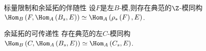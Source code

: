 \begin{proposition}{标量限制和余延拓的伴随性}{}
	设$F$是左$B$-模,则存在典范的$\Z$-模同构$\Hom_{B}\left(F,\Hom_{A}\left(B_{s},E\right)\right)\simeq\Hom_{A}\left(\rho_{\ast}\left(F\right),E\right)$.
\end{proposition}

\begin{proposition}{余延拓的可传递性}{}
	存在典范的左$C$-模同构$\Hom_{B}\left(C,\Hom_{A}\left(B_{s},E\right)\right)\simeq\Hom_{A}\left(C_{s},E\right)$.
\end{proposition}














